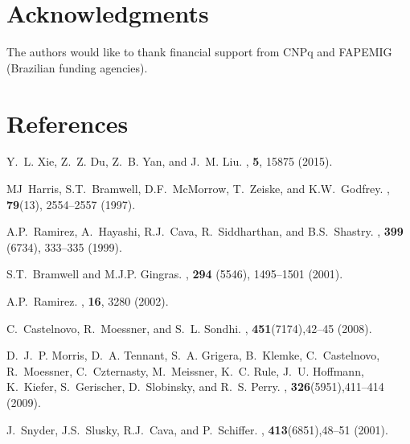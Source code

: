 \documentclass[aps,showkeys,groupedaddress]{revtex4}
\begin{document}
\section*{Acknowledgments}
The authors would like to thank financial support from CNPq and FAPEMIG (Brazilian funding agencies).

\section*{References}

\begin{thebibliography}{39}

Y.~L. Xie, Z.~Z. Du, Z.~B. Yan, and J.~M. Liu.
, {\bf{5}}, 15875 {(2015)}.

MJ~Harris, S.T.~Bramwell, D.F.~McMorrow, T.~Zeiske, and K.W.~Godfrey.
, {\bf{79}}({13}), {2554--2557} {(1997)}.

A.P.~Ramirez, A.~Hayashi, R.J.~Cava, R.~Siddharthan, and B.S.~Shastry.
, {\bf{399}} ({6734}), {333--335} {(1999)}.

S.T.~Bramwell and M.J.P. Gingras.
, {\bf{294}} ({5546}), {1495--1501} {(2001)}.

A.P.~Ramirez.
,
  {\bf{16}}, 3280 {(2002)}.

C.~Castelnovo, R.~Moessner, and S.~L. Sondhi.
, {\bf{451}}({7174}),{42--45} {(2008)}.

D.~J.~P. Morris, D.~A. Tennant, S.~A. Grigera, B.~Klemke, C.~Castelnovo,
  R.~Moessner, C.~Czternasty, M.~Meissner, K.~C. Rule, J.~U. Hoffmann,
  K.~Kiefer, S.~Gerischer, D.~Slobinsky, and R.~S. Perry.
, {\bf{326}}({5951}),{411--414} {(2009)}.

J.~Snyder, J.S.~Slusky, R.J.~Cava, and P.~Schiffer.
, {\bf{413}}({6851}),{48--51} {(2001)}.


\end{thebibliography}
\end{document}
